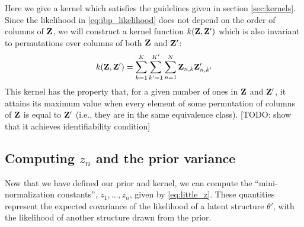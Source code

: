 Here we give a kernel which satisfies the guidelines given in section \ref{sec:kernels}.  %
%
%
Since the likelihood in \eqref{eq:ibp_likelihood} does not depend on the order of columns of $\mathbf{Z}$, we will construct a kernel function $k(\mathbf{Z}, \mathbf{Z}')$ which is also invariant to permutations over columns of both $\mathbf{Z}$ and $\mathbf{Z}'$:
%
\begin{align}
k(\mathbf{Z}, \mathbf{Z}') 
 =  \sum_{k=1}^{K} \sum_{k'=1}^{K'} \sum_{n=1}^N \mathbf{Z}_{n,k} \mathbf{Z}'_{n,k'} 
\label{eq:IBP_kernel1}
\end{align}
%
This kernel has the property that, for a given number of ones in $\mathbf{Z}$ and $\mathbf{Z}'$, it attains its maximum value when every element of some permutation of columns of $\mathbf{Z}$ is equal to $\mathbf{Z}'$ (i.e., they are in the same equivalence class).  [TODO: show that it achieves identifiability condition]

\subsection{Computing $z_n$ and the prior variance}

Now that we have defined our prior and kernel, we can compute the ``mini-normalization constants'', $z_1, \dots, z_n$, given by \eqref{eq:little_z}.  These quantities represent the expected covariance of the likelihood of a latent structure $\theta'$, with the likelihood of another structure drawn from the prior.

